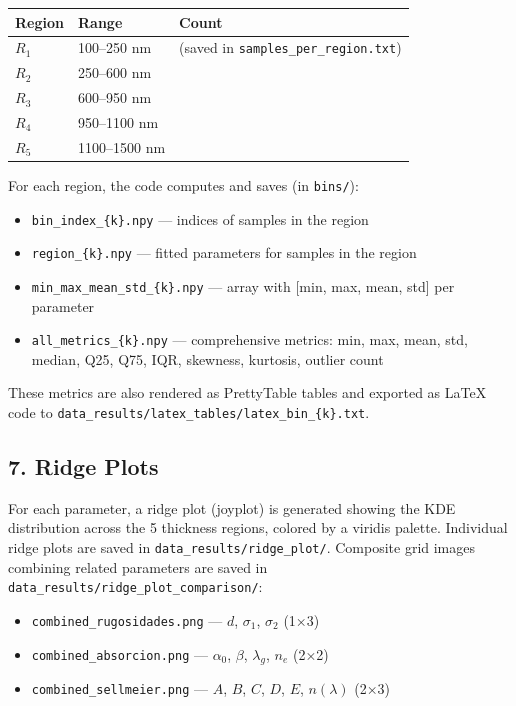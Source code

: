 \documentclass[11pt,a4paper]{article}
\begin{document}
\begin{table}[htbp]
\centering
\begin{tabular}{lll}
\toprule
\textbf{Region} & \textbf{Range} & \textbf{Count} \\
\midrule
$R_1$ & 100--250 nm  & (saved in {\tt samples\_per\_region.txt}) \\
$R_2$ & 250--600 nm  & \\
$R_3$ & 600--950 nm  & \\
$R_4$ & 950--1100 nm & \\
$R_5$ & 1100--1500 nm & \\
\bottomrule
\end{tabular}
\end{table}

For each region, the code computes and saves (in {\tt bins/}):
\begin{itemize}
    \item {\tt bin\_index\_\{k\}.npy} --- indices of samples in the region
    \item {\tt region\_\{k\}.npy} --- fitted parameters for samples in the region
    \item {\tt min\_max\_mean\_std\_\{k\}.npy} --- array with [min, max, mean, std] per parameter
    \item {\tt all\_metrics\_\{k\}.npy} --- comprehensive metrics: min, max, mean, std, median, Q25, Q75, IQR, skewness, kurtosis, outlier count
\end{itemize}

These metrics are also rendered as PrettyTable tables and exported as LaTeX code to {\tt data\_results/latex\_tables/latex\_bin\_\{k\}.txt}.

\subsection{7. Ridge Plots}
For each parameter, a ridge plot (joyplot) is generated showing the KDE distribution across the 5 thickness regions, colored by a viridis palette. Individual ridge plots are saved in {\tt data\_results/ridge\_plot/}. Composite grid images combining related parameters are saved in {\tt data\_results/ridge\_plot\_comparison/}:
\begin{itemize}
    \item {\tt combined\_rugosidades.png} --- $d$, $\sigma_1$, $\sigma_2$ (1×3)
    \item {\tt combined\_absorcion.png} --- $\alpha_0$, $\beta$, $\lambda_g$, $n_e$ (2×2)
    \item {\tt combined\_sellmeier.png} --- $A$, $B$, $C$, $D$, $E$, $n(\lambda)$ (2×3)
\end{itemize}
\end{document}
